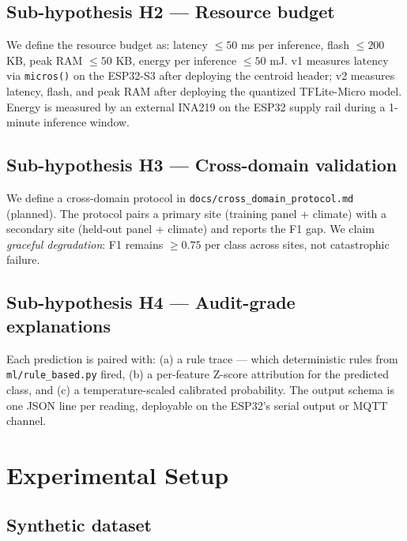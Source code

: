 \documentclass[12pt,journal,onecolumn]{IEEEtran}
\begin{document}
\subsection{Sub-hypothesis H2 --- Resource budget}

We define the resource budget as: latency $\leq 50$ ms per inference,
flash $\leq 200$ KB, peak RAM $\leq 50$ KB, energy per inference
$\leq 50$ mJ. v1 measures latency via \texttt{micros()} on the ESP32-S3
after deploying the centroid header; v2 measures latency, flash, and
peak RAM after deploying the quantized TFLite-Micro model. Energy is
measured by an external INA219 on the ESP32 supply rail during a
1-minute inference window.

\subsection{Sub-hypothesis H3 --- Cross-domain validation}

We define a cross-domain protocol in \texttt{docs/cross\_domain\_protocol.md}
(planned). The protocol pairs a primary site (training panel + climate)
with a secondary site (held-out panel + climate) and reports the F1
gap. We claim \emph{graceful degradation}: F1 remains $\geq 0.75$ per
class across sites, not catastrophic failure.

\subsection{Sub-hypothesis H4 --- Audit-grade explanations}

Each prediction is paired with: (a) a rule trace --- which deterministic
rules from \texttt{ml/rule\_based.py} fired, (b) a per-feature Z-score
attribution for the predicted class, and (c) a temperature-scaled
calibrated probability. The output schema is one JSON line per reading,
deployable on the ESP32's serial output or MQTT channel.

\section{Experimental Setup}
\label{sec:setup}

\subsection{Synthetic dataset}
\end{document}

